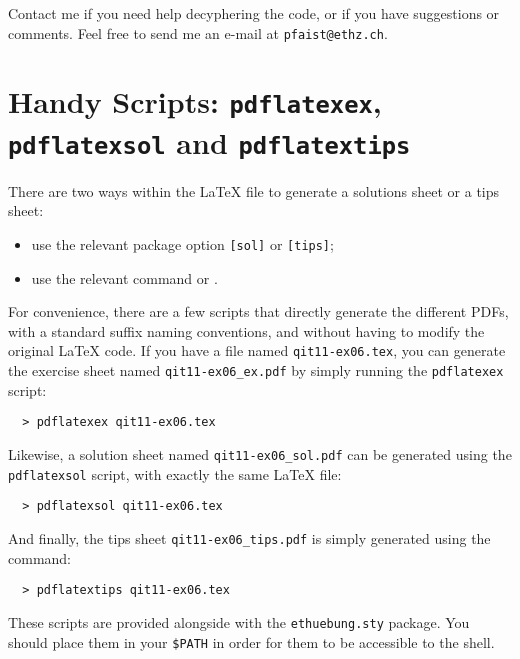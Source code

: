 \documentclass[11pt,a4paper]{article}
\begin{document}
Contact me if you need help decyphering the code, or if you have suggestions or
comments. Feel free to send me an e-mail at \texttt{pfaist{@}ethz.ch}.


\section{Handy Scripts: \texttt{pdflatexex}, \texttt{pdflatexsol} and \texttt{pdflatextips}}
\label{sec:handyscriptspdflatex}

There are two ways within the \LaTeX{} file to generate a solutions sheet or a tips sheet:
\begin{itemize}
\item use the relevant package option \texttt{[sol]} or \texttt{[tips]};
\item use the relevant command  or
  .
\end{itemize}

For convenience, there are a few scripts that directly generate the different PDFs, with a
standard suffix naming conventions, and without having to modify the original \LaTeX{}
code. If you have a file named \texttt{qit11-ex06.tex}, you can generate the exercise
sheet named \verb|qit11-ex06_ex.pdf| by simply running the \texttt{pdflatexex} script:
\begin{pkgverbatim}
\begin{verbatim}
  > pdflatexex qit11-ex06.tex
\end{verbatim}
\end{pkgverbatim}
Likewise, a solution sheet named \verb|qit11-ex06_sol.pdf| can be generated using the
\texttt{pdflatexsol} script, with exactly the same \LaTeX{} file:
\begin{pkgverbatim}
\begin{verbatim}
  > pdflatexsol qit11-ex06.tex
\end{verbatim}
\end{pkgverbatim}
And finally, the tips sheet \verb|qit11-ex06_tips.pdf| is simply generated using the
command:
\begin{pkgverbatim}
\begin{verbatim}
  > pdflatextips qit11-ex06.tex
\end{verbatim}
\end{pkgverbatim}

These scripts are provided alongside with the \texttt{ethuebung.sty} package. You should
place them in your \texttt{\$PATH} in order for them to be accessible to the shell.
\end{document}
